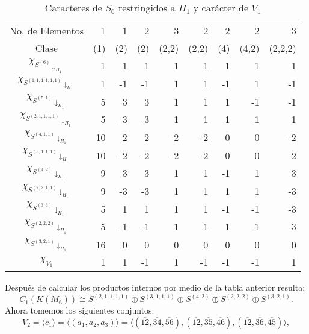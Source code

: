 \documentclass[12pt]{book}
\theoremstyle{definition}
\newcounter{in}
\begin{document}
  \begin{table}[!hbtp]
    \centering
    \begin{tabular}{c |r r r r r r r r}
      No. de Elementos  & 1 & 1 & 2 & 3 & 2 & 2 & 2 & 3  \\
      Clase&(1)& (2) & (2) & (2,2) & (2,2)& (4) & (4,2) & (2,2,2)\\
      \hline
      $\chi_{S^{{(6)}}\downarrow_{H_{1}}}$         & 1 & 1 &1  & 1 & 1 & 1 & 1 & 1\\
      $\chi_{S^{{(1,1,1,1,1,1)}}\downarrow_{H_{1}}}$ & 1 & -1&-1 & 1 & 1 &-1 & 1 &-1\\
      $\chi_{S^{{(5,1)}}\downarrow_{H_{1}}}$       & 5 & 3 & 3 & 1 & 1 & 1 &-1 &-1\\
      $\chi_{S^{{(2,1,1,1,1)}}\downarrow_{H_{1}}}$  & 5 & -3& -3 & 1 &1 &-1 &-1 & 1\\
      $\chi_{S^{{(4,1,1)}}\downarrow_{H_{1}}}$     & 10& 2  & 2 &-2 &-2& 0 & 0 & -2\\
      $\chi_{S^{{(3,1,1,1)}}\downarrow_{H_{1}}}$    & 10&-2 & -2&-2 & -2& 0 & 0 &2\\
      $\chi_{S^{{(4,2)}}\downarrow_{H_{1}}}$       & 9 & 3 & 3 & 1 & 1 & -1& 1 & 3\\
      $\chi_{S^{{(2,2,1,1)}}\downarrow_{H_{1}}}$    & 9 &-3 & -3&1  & 1 & 1 & 1 & -3\\
      $\chi_{S^{{(3,3)}}\downarrow_{H_{1}}}$       & 5 & 1 & 1 &1  &1  & -1& -1& -3\\
      $\chi_{S^{{(2,2,2)}}\downarrow_{H_{1}}}$     & 5 &-1 & -1&1  & 1 & 1 &-1& 3\\
      $\chi_{S^{{(3,2,1)}}\downarrow_{H_{1}}}$     & 16 &0 &0  & 0 & 0 & 0 & 0& 0\\
      \hline
      $\chi_{V_{1}}$        & 1 & 1 & -1 & 1 & -1 & -1 &-1 & 1  \\
    \end{tabular}
    
    \caption{Caracteres de $S_{6}$ restringidos a $H_{1}$ y carácter de $V_{1}$}
    \label{tab:clanes-H_1-6}
  \end{table}
  Después de calcular los productos internos por medio de la tabla
  anterior resulta:
  \begin{equation}
    C_{1}(K(M_{6}))\cong S^{(2,1,1,1,1)}\oplus S^{(3,1,1,1)}\oplus
    S^{(4,2)} \oplus S^{(2,2,2)}\oplus S^{(3,2,1)}.
    \label{C1-KM6}
  \end{equation}
  Ahora tomemos los siguientes conjuntos:
  $$V_{2}=\langle c_{1}\rangle=\langle
  (a_{1},a_{2},a_{3})\rangle=\langle(\overline{12},\overline{34},\overline{56}),(\overline{12},\overline{35},\overline{46}),(\overline{12},\overline{36},\overline{45})\rangle,$$
\end{document}
